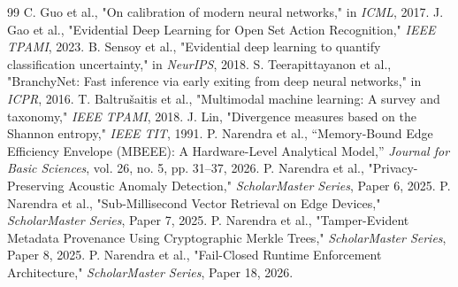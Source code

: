 \documentclass[conference]{IEEEtran}
\begin{document}
\begin{thebibliography}{99}
 C. Guo et al., "On calibration of modern neural networks," in \textit{ICML}, 2017.
 J. Gao et al., "Evidential Deep Learning for Open Set Action Recognition," \textit{IEEE TPAMI}, 2023.
 B. Sensoy et al., "Evidential deep learning to quantify classification uncertainty," in \textit{NeurIPS}, 2018.
 S. Teerapittayanon et al., "BranchyNet: Fast inference via early exiting from deep neural networks," in \textit{ICPR}, 2016.
 T. Baltrušaitis et al., "Multimodal machine learning: A survey and taxonomy," \textit{IEEE TPAMI}, 2018.
 J. Lin, "Divergence measures based on the Shannon entropy," \textit{IEEE TIT}, 1991.
 P. Narendra et al., ``Memory-Bound Edge Efficiency Envelope (MBEEE): A Hardware-Level Analytical Model,'' \textit{Journal for Basic Sciences}, vol. 26, no. 5, pp. 31--37, 2026.
 P. Narendra et al., "Privacy-Preserving Acoustic Anomaly Detection," \textit{ScholarMaster Series}, Paper 6, 2025.
 P. Narendra et al., "Sub-Millisecond Vector Retrieval on Edge Devices," \textit{ScholarMaster Series}, Paper 7, 2025.
 P. Narendra et al., "Tamper-Evident Metadata Provenance Using Cryptographic Merkle Trees," \textit{ScholarMaster Series}, Paper 8, 2025.
 P. Narendra et al., "Fail-Closed Runtime Enforcement Architecture," \textit{ScholarMaster Series}, Paper 18, 2026.
\end{thebibliography}
\end{document}
